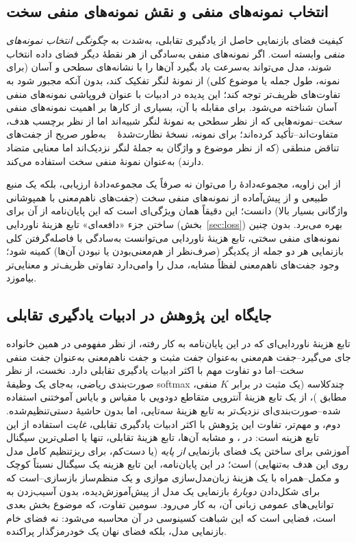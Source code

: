 \subsection{انتخاب نمونه‌های منفی و نقش نمونه‌های منفی سخت}
\label{sec:lit-hardneg}
کیفیت فضای بازنمایی حاصل از یادگیری تقابلی، به‌شدت به \emph{چگونگی انتخاب نمونه‌های منفی} وابسته است. اگر نمونه‌های منفی به‌سادگی از هر نقطهٔ دیگر فضای داده انتخاب شوند، مدل می‌تواند به‌سرعت یاد بگیرد آن‌ها را با نشانه‌های سطحی و آسان (برای نمونه، طول جمله یا موضوع کلی) از نمونهٔ لنگر تفکیک کند، بدون آنکه مجبور شود به تفاوت‌های ظریف‌تر توجه کند؛ این پدیده در ادبیات با عنوان فروپاشی نمونه‌های منفی آسان
شناخته می‌شود. برای مقابله با آن، بسیاری از کارها بر اهمیت نمونه‌های منفی \emph{سخت}--نمونه‌هایی که از نظر سطحی به نمونهٔ لنگر شبیه‌اند اما از نظر برچسب هدف، متفاوت‌اند--تأکید کرده‌اند؛ برای نمونه، نسخهٔ نظارت‌شدهٔ
~\cite{gao2021simcse}
به‌طور صریح از جفت‌های تناقض منطقی (که از نظر موضوع و واژگان به جملهٔ لنگر نزدیک‌اند اما معنایی متضاد دارند) به‌عنوان نمونهٔ منفی سخت استفاده می‌کند.

از این زاویه، مجموعه‌دادهٔ
را می‌توان نه صرفاً یک مجموعه‌دادهٔ ارزیابی، بلکه یک منبع طبیعی و از پیش‌آماده از نمونه‌های منفی سخت (جفت‌های ناهم‌معنی با همپوشانی واژگانی بسیار بالا) دانست؛ این دقیقاً همان ویژگی‌ای است که این پایان‌نامه از آن برای ساختن جزء «دافعه‌ای»
تابع هزینهٔ ناوردایی (بخش~\ref{sec:loss}) بهره می‌برد. بدون چنین نمونه‌های منفی سختی، تابع هزینهٔ ناوردایی می‌توانست به‌سادگی با فاصله‌گرفتن کلی بازنمایی هر دو جمله از یکدیگر (صرف‌نظر از هم‌معنی‌بودن یا نبودن آن‌ها) کمینه شود؛ وجود جفت‌های ناهم‌معنی لفظاً مشابه، مدل را وامی‌دارد تفاوتی ظریف‌تر و معنایی‌تر بیاموزد.

\subsection{جایگاه این پژوهش در ادبیات یادگیری تقابلی}
تابع هزینهٔ ناوردایی‌ای که در این پایان‌نامه به کار رفته، از نظر مفهومی در همین خانواده جای می‌گیرد--جفت هم‌معنی به‌عنوان جفت مثبت و جفت ناهم‌معنی به‌عنوان جفت منفی سخت--اما دو تفاوت مهم با اکثر ادبیات یادگیری تقابلی دارد. نخست، از نظر صورت‌بندی ریاضی، به‌جای یک وظیفهٔ softmax چندکلاسه (یک مثبت در برابر
$K$
منفی، مطابق
)، از یک تابع هزینهٔ آنتروپی متقاطع دودویی با مقیاس و بایاس آموختنی استفاده شده--صورت‌بندی‌ای نزدیک‌تر به تابع هزینهٔ سه‌تایی، اما بدون حاشیهٔ دستی‌تنظیم‌شده. دوم، و مهم‌تر، تفاوت این پژوهش با اکثر ادبیات یادگیری تقابلی، \emph{غایت} استفاده از این تابع هزینه است: در
، 
و مشابه آن‌ها، تابع هزینهٔ تقابلی، تنها یا اصلی‌ترین سیگنال آموزشی برای ساختن یک فضای بازنمایی \emph{از پایه} (یا دست‌کم، برای ریزتنظیم کامل مدل روی این هدف به‌تنهایی) است؛ در این پایان‌نامه، این تابع هزینه یک سیگنال نسبتاً کوچک و مکمل--همراه با یک هزینهٔ زبان‌مدل‌سازی موازی و یک منظم‌ساز بازسازی--است که برای شکل‌دادن \emph{دوبارهٔ} بازنمایی یک مدل از پیش‌آموزش‌دیده، بدون آسیب‌زدن به توانایی‌های عمومی زبانی آن، به کار می‌رود. سومین تفاوت، که موضوع بخش بعدی است، فضایی است که این شباهت کسینوسی در آن محاسبه می‌شود: نه فضای خام بازنمایی مدل، بلکه فضای نهان یک خودرمزگذار پراکنده.

